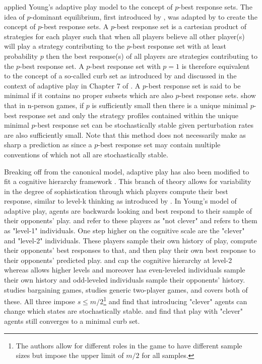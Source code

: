 \cite{durieu2011adaptive} applied Young's adaptive play model to the concept of $p$-best response sets. 
The idea of $p$-dominant equilibrium, first introduced by \cite{morris1995p}, was adapted by \cite{tercieux2006p} to create the concept of $p$-best response sets.
A $p$-best response set is a cartesian product of strategies for each player such that when all players believe all other player(s) will play a strategy contributing to the $p$-best response set with at least probability $p$ then the best response(s) of all players are strategies contributing to the $p$-best response set.
A $p$-best response set with $p=1$ is therefore equivalent to the concept of a so-called curb set as introduced by \cite{basu1991strategy} and discussed in the context of adaptive play in Chapter 7 of \cite{Young1998}. 
A $p$-best response set is said to be minimal if it contains no proper subsets which are also $p$-best response sets.  \cite{durieu2011adaptive} show that in n-person games, if $p$ is sufficiently small then there is a unique minimal $p$-best response set and only the strategy profiles contained within the 
unique minimal $p$-best response set can be stochastically stable given perturbation rates are also sufficiently small.
Note that this method does not necessarily make as sharp a prediction as \cite{young1993evolution} since a $p$-best response set may contain multiple conventions of which not all are stochastically stable.

Breaking off from the canonical model, adaptive play has also been modified to fit a cognitive hierarchy framework \citep{saez1999clever, matros2003clever, khan2014cognitive}. This branch of theory allows for variability in the degree of sophistication through which players compute their best response, similar to level-k thinking as introduced by \cite{nagel1995unraveling}. In Young's model of adaptive play, agents are backwards looking and best respond to their sample of their opponents' play. \cite{saez1999clever} and \cite{matros2003clever} refer to these players as "not clever" and \cite{khan2014cognitive} refers to them as "level-1" individuals. One step higher on the cognitive scale are the "clever" and "level-2" individuals. These players sample their own history of play, compute their 
opponents' best responses to that, and then play their own best response to their opponents' predicted play. 
\cite{saez1999clever} and \cite{matros2003clever} cap the cognitive hierarchy at level-2 whereas \cite{khan2014cognitive} allows higher levels and moreover has even-leveled individuals sample their own history and odd-leveled individuals sample their opponents' history. 
\cite{saez1999clever} studies bargaining games, \cite{matros2003clever} studies generic two-player games, and \cite{khan2014cognitive} covers both of these. All three impose $s \leq m/2$\footnote{The authors allow for different roles in the game to have different sample sizes but impose the upper limit of $m/2$ for all samples.} and find that introducing "clever" agents can change which states are stochastically stable. \cite{matros2003clever} and \cite{khan2014cognitive} find that play with "clever" agents still converges to a minimal curb set.

